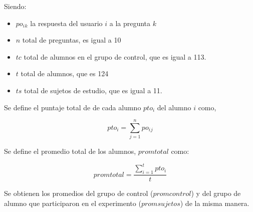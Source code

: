 Siendo:

\begin{itemize}
    \item $po_i{_k}$ la respuesta del usuario $i$ a la pregunta $k$
    \item $n$ total de preguntas, es igual a 10
    \item $tc$ total de alumnos en el grupo de control, que es igual a 113.
    \item $t$ total de alumnos, que es 124
    \item $ts$ total de sujetos de estudio, que es igual a 11.
\end{itemize}

Se define el puntaje total de de cada alumno $pto_i$ del alumno $i$ como, 

\begin{equation*}
    pto_i = \sum_{j=1}^n{po_i{_j}}
\end{equation*}

Se define el promedio total de los alumnos, $promtotal$ como:

\begin{equation*}
    promtotal = \frac{\sum_{i=1}^t{pto_i}}{t}
\end{equation*}

Se obtienen los promedios del grupo de control ($promcontrol$) y del grupo de alumno que
participaron en el experimento ($promsujetos$) de la misma manera.
